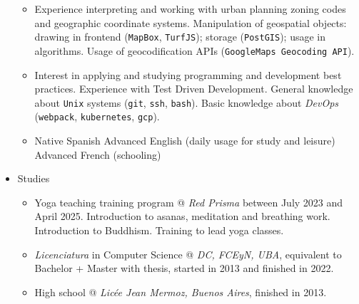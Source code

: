 \documentclass[a4paper]{article}
\begin{document}
\begin{itemize}
\begin{itemize}
    \item
      Experience interpreting and working with urban planning zoning codes and
      geographic coordinate systems. \newline
      Manipulation of geospatial objects: drawing in frontend (\texttt{MapBox},
      \texttt{TurfJS}); storage (\texttt{PostGIS}); usage in algorithms.
      \newline
      Usage of geocodification APIs (\texttt{GoogleMaps Geocoding API}).

    \item
      Interest in applying and studying programming and development best
      practices. \newline
      Experience with Test Driven Development. \newline
      General knowledge about \texttt{Unix} systems (\texttt{git},
      \texttt{ssh}, \texttt{bash}). \newline
      Basic knowledge about \textit{DevOps} (\texttt{webpack},
      \texttt{kubernetes}, \texttt{gcp}).

    \item
      Native Spanish \newline
      Advanced English (daily usage for study and leisure) \newline
      Advanced French (schooling)

  \end{itemize}

  \item Studies
  \begin{itemize}
    \item
      Yoga teaching training program @ \textit{Red Prisma} between July 2023 and
      April 2025. \newline
      Introduction to asanas, meditation and breathing work. \newline
      Introduction to Buddhism. \newline
      Training to lead yoga classes.

    \item
      \textit{Licenciatura} in Computer Science @ \textit{DC, FCEyN, UBA},
      equivalent to Bachelor + Master with thesis,
      started in 2013 and finished in 2022.

    \item
      High school @ \textit{Licée Jean Mermoz, Buenos Aires}, finished in 2013.

  \end{itemize}

\end{itemize}
\end{document}

